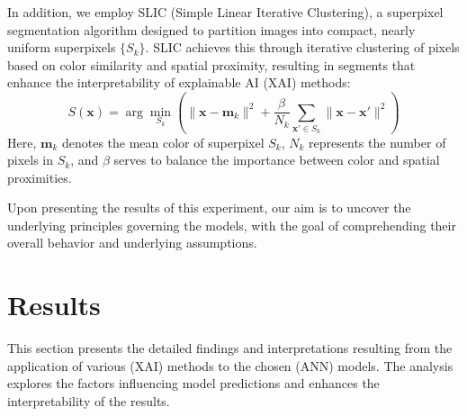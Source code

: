 \documentclass[journal, a4paper]{IEEEtran}
\begin{document}
In addition, we employ SLIC (Simple Linear Iterative Clustering), a superpixel segmentation algorithm designed to partition images into compact, nearly uniform superpixels \( \{ S_k \} \).
SLIC achieves this through iterative clustering of pixels based on color similarity and spatial proximity, resulting in segments that enhance the interpretability of explainable AI (XAI) methods:
\[
S(\mathbf{x}) = \arg \min_{S_k} \left( \|\mathbf{x} - \mathbf{m}_k\|^2 + \frac{\beta}{N_k} \sum_{\mathbf{x}' \in S_k} \|\mathbf{x} - \mathbf{x}'\|^2 \right)
\]
Here, \( \mathbf{m}_k \) denotes the mean color of superpixel \( S_k \), \( N_k \) represents the number of pixels in \( S_k \), and \( \beta \) serves to balance the importance between color and spatial proximities.

Upon presenting the results of this experiment, our aim is to uncover the underlying principles governing the models, with the goal of comprehending their overall behavior and underlying assumptions.

\section{Results}\label{sec:results}
This section presents the detailed findings and interpretations resulting from the application of various (XAI) methods to the chosen (ANN) models.
The analysis explores the factors influencing model predictions and enhances the interpretability of the results.
\end{document}
